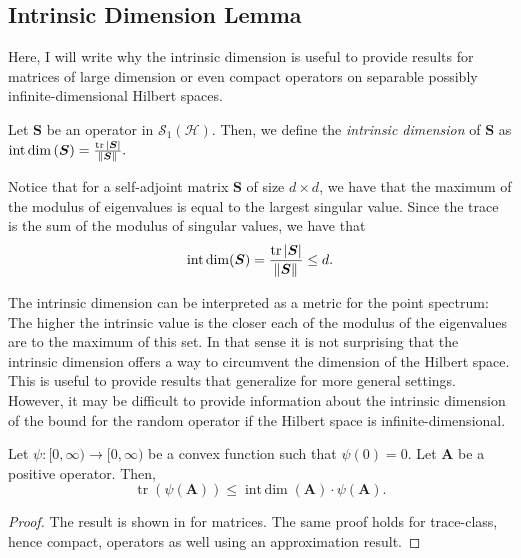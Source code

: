 \subsection{Intrinsic Dimension Lemma}
Here, I will write why the intrinsic dimension is useful to provide results for matrices of large dimension or even compact operators on separable possibly infinite-dimensional Hilbert spaces. 
\begin{defn}
   Let \( \bm{S} \) be an operator in \( \mathcal{S}_1(\mathcal{H}) \). Then, we define the \emph{intrinsic dimension} of \( \bm{S} \) as 
   \( \operatorname{int\, dim}\left(\bm{S}\right)= \frac{\operatorname{tr} \abs{\bm{S}}}{\norm{\bm{S}}_{}}. \)
\end{defn}

Notice that for a self-adjoint matrix \( \bm{S} \) of size \( d\times d \), we have that the maximum of the modulus of eigenvalues is equal to the largest singular value. Since the trace is the sum of the modulus of singular values, we have that 
\[ \operatorname{int\, dim}(\bm{S})= \frac{\operatorname{tr}\abs{\bm{S}}}{\norm{\bm{S}}_{}} \leq d.\]

The intrinsic dimension can be interpreted as a metric for the point spectrum: The higher the intrinsic value is the closer each of the modulus of the eigenvalues are to the maximum of this set.
In that sense it is not surprising that the intrinsic dimension offers a way to circumvent the dimension of the Hilbert space. This is useful to provide results that generalize for more general settings. However, it may be difficult to provide information about the intrinsic dimension of the bound for the random operator if the Hilbert space is infinite-dimensional.


\begin{lem}
    Let \( \psi: [0,\infty) \to [0,\infty ) \) be a convex function such that \( \psi(0)=0 \). Let \( \bm{A} \) be a positive operator. Then,
    \[ \operatorname{tr}\left( \psi(\bm{A})\right) \leq \operatorname{int\, dim}\left(\bm{A}\right) \cdot \psi(\bm{A}) .\]
\end{lem}

\begin{proof}
  The result is shown in \cite{tropp2015introduction} for matrices. The same proof holds for trace-class, hence compact, operators as well using an approximation result.
\end{proof}



